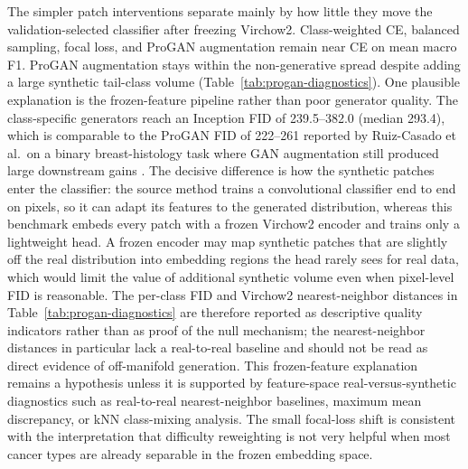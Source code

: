 \documentclass[11pt]{article}
\begin{document}
The simpler patch interventions separate mainly by how little they move the validation-selected classifier after freezing Virchow2. Class-weighted CE, balanced sampling, focal loss, and ProGAN augmentation remain near CE on mean macro F1. ProGAN augmentation stays within the non-generative spread despite adding a large synthetic tail-class volume (Table~\ref{tab:progan-diagnostics}). One plausible explanation is the frozen-feature pipeline rather than poor generator quality. The class-specific generators reach an Inception FID of \num{239.5}--\num{382.0} (median \num{293.4}), which is comparable to the ProGAN FID of \num{222}--\num{261} reported by Ruiz-Casado et al.\ on a binary breast-histology task where GAN augmentation still produced large downstream gains \citep{ruizcasado2024enhancingHistopathological}. The decisive difference is how the synthetic patches enter the classifier: the source method trains a convolutional classifier end to end on pixels, so it can adapt its features to the generated distribution, whereas this benchmark embeds every patch with a frozen Virchow2 encoder and trains only a lightweight head. A frozen encoder may map synthetic patches that are slightly off the real distribution into embedding regions the head rarely sees for real data, which would limit the value of additional synthetic volume even when pixel-level FID is reasonable. The per-class FID and Virchow2 nearest-neighbor distances in Table~\ref{tab:progan-diagnostics} are therefore reported as descriptive quality indicators rather than as proof of the null mechanism; the nearest-neighbor distances in particular lack a real-to-real baseline and should not be read as direct evidence of off-manifold generation. This frozen-feature explanation remains a hypothesis unless it is supported by feature-space real-versus-synthetic diagnostics such as real-to-real nearest-neighbor baselines, maximum mean discrepancy, or kNN class-mixing analysis. The small focal-loss shift is consistent with the interpretation that difficulty reweighting is not very helpful when most cancer types are already separable in the frozen embedding space.

\begin{table}[ht]
  \centering
  \small
  
  \caption{ProGAN augmentation diagnostics for seed~0. ``Generated'' counts are synthetic patches added per class to reach the head-class training patch count. Inception FID compares generated patches to the real training subset used for GAN training. Virchow2 mean NN is the mean, over a fixed synthetic subsample, of the minimum $L_2$ distance to real same-class embeddings in the frozen feature cache.}
  \label{tab:progan-diagnostics}
\end{table}
\end{document}
